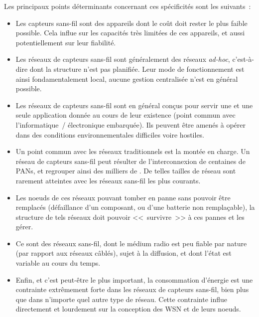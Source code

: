 \bigskip

Les principaux points déterminants concernant ces spécificités sont les
suivants~:

\begin{itemize}

\item Les capteurs sans-fil sont des appareils dont le coût doit rester
le plus faible possible. Cela influe sur les capacités très limitées
de ces appareils, et aussi potentiellement sur leur fiabilité.

\item Les réseaux de capteurs sans-fil sont généralement des réseaux
\emph{ad-hoc}, c'est-à-dire dont la structure n'est pas planifiée.
Leur mode de fonctionnement est ainsi fondamentalement local, aucune
gestion centralisée n'est en général possible.

\item Les réseaux de capteurs sans-fil sont en général conçus pour
servir une et une seule application donnée au cours de leur existence
(point commun avec l'informatique~/ électronique embarquée). Ils
peuvent être amenés à opérer dans des conditions environnementales
difficiles voire hostiles.

\item Un point commun avec les réseaux traditionnels est la montée
en charge. Un réseau de capteurs sans-fil peut résulter de l'interconnexion
de centaines de PANs, et regrouper ainsi des milliers de .
De telles tailles de réseau sont rarement atteintes avec les réseaux
sans-fil les plus courants.

\item Les noeuds de ces réseaux pouvant tomber en panne sans pouvoir
être remplacés (défaillance d'un composant, ou d'une batterie non
remplaçable), la structure de tels réseaux doit pouvoir <<~survivre~>>
à ces pannes et les gérer.

\item Ce sont des réseaux sans-fil, dont le médium radio est peu fiable
par nature (par rapport aux réseaux câblés), sujet à la diffusion, et
dont l'état est variable au cours du temps.

\item Enfin, et c'est peut-être le plus important, la consommation
d'énergie est une contrainte extrêmement forte dans les réseaux de capteurs
sans-fil, bien plus que dans n'importe quel autre type de réseau. Cette
contrainte influe directement et lourdement sur la conception des WSN
et de leurs noeuds.

\end{itemize}

